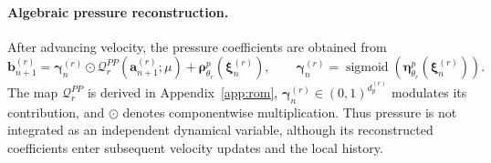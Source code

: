 \paragraph{Algebraic pressure reconstruction.}
After advancing velocity, the pressure coefficients are obtained from
\begin{equation}
  \bm b_{n+1}^{(r)}
  =\bm\gamma_n^{(r)}\odot
     \mathcal Q_r^{PP}(\bm a_{n+1}^{(r)};\mu)
   +\bm\rho^p_{\theta_r}(\bm\xi_n^{(r)}),
  \qquad
  \bm\gamma_n^{(r)}
  =\operatorname{sigmoid}\!\left(
     \bm\eta^p_{\theta_r}(\bm\xi_n^{(r)})\right).
  \label{eq:main_pressure_closure}
\end{equation}
The map $\mathcal Q_r^{PP}$ is derived in Appendix~\ref{app:rom},
$\bm\gamma_n^{(r)}\in(0,1)^{d_p^{(r)}}$ modulates its contribution,
and $\odot$ denotes componentwise multiplication. Thus pressure is
not integrated as an independent dynamical variable, although its
reconstructed coefficients enter subsequent velocity updates and
the local history.
